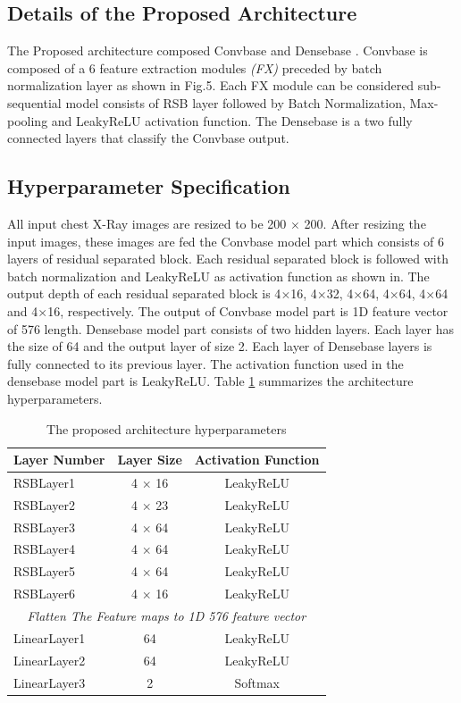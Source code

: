 \subsection{Details of the Proposed Architecture}
The Proposed architecture composed Convbase and Densebase . Convbase is composed of a $6$ feature extraction modules \textit{(FX)} preceded by batch normalization layer as shown in Fig.5. Each FX module can be considered sub-sequential model consists of RSB layer followed by Batch Normalization, Max-pooling and LeakyReLU activation function. The Densebase is a two fully connected layers that classify the Convbase output.


\subsection{Hyperparameter Specification}
All input  chest X-Ray images are resized to be 200 $\times$ 200. After resizing the input images, these images are fed the Convbase model part which consists of 6 layers of residual separated block. Each residual separated block is followed with batch normalization and LeakyReLU \cite{he2015delving} as activation function  as shown in. The output depth of each  residual separated block is 4$\times$16, 4$\times$32, 4$\times$64, 4$\times$64, 4$\times$64 and 4$\times$16, respectively. The output of Convbase model part is 1D feature vector of 576 length. Densebase model part consists of two hidden layers. Each layer has the  size of 64 and the output layer of size 2. Each layer of Densebase layers is fully connected to its previous layer. The activation function used in the densebase model part is LeakyReLU. Table \ref{lyrSpec} summarizes the architecture hyperparameters.

\begin{table}[htbp]
\caption{The proposed architecture hyperparameters}
\begin{center}

\begin{tabular}{|l|c|c|}
\hline
\textbf{Layer Number} & \textbf{Layer Size} & \textbf{Activation Function} \\
\hline
\hline
RSBLayer1 & 4 $\times$ 16 & LeakyReLU\\
\hline
RSBLayer2 & 4 $\times$ 23 & LeakyReLU\\
\hline
RSBLayer3 & 4 $\times$ 64 & LeakyReLU\\
\hline
RSBLayer4 & 4 $\times$ 64 & LeakyReLU\\
\hline
RSBLayer5 & 4 $\times$ 64 & LeakyReLU\\
\hline
RSBLayer6 & 4 $\times$ 16 & LeakyReLU\\
\hline
\multicolumn{3}{|c|}{\textit{Flatten The Feature maps to 1D 576 feature  vector}}\\
\cline{1-3}
LinearLayer1 & 64 & LeakyReLU\\
\hline
LinearLayer2 & 64 & LeakyReLU\\
\hline
LinearLayer3 & 2 & Softmax\\
\hline
\end{tabular}
\label{lyrSpec}
\end{center}
\end{table}


